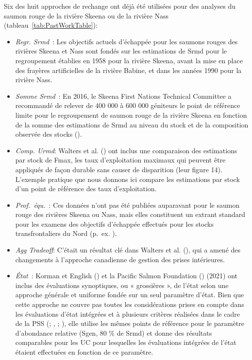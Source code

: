 \documentclass[french,11pt]{book}
\begin{document}
Six des huit approches de rechange ont déjà été utilisées pour des analyses du saumon rouge de la rivière Skeena ou de la rivière Nass (tableau~\ref{tab:PastWorkTable}):
\begin{itemize}

\item
  \emph{Regr. Srmd}~: Les objectifs actuels d'échappée pour les saumons rouges des rivières Skeena et Nass sont fondés sur les estimations de Srmd pour le regroupement établies en 1958 pour la rivière Skeena, avant la mise en place des frayères artificielles de la rivière Babine, et dans les années 1990 pour la rivière Nass.
\item
  \emph{Somme Srmd}~: En 2016, le Skeena First Nations Technical Committee a recommandé de relever de 400 000 à 600 000 géniteurs le point de référence limite pour le regroupement de saumon rouge de la rivière Skeena en fonction de la somme des estimations de Srmd au niveau du stock et de la composition observée des stocks ().
\item
  \emph{Comp. Urmd}: Walters et al. () ont inclus une comparaison des estimations par stock de Fmax, les taux d'exploitation maximaux qui peuvent être appliqués de façon durable sans causer de disparition (leur figure 14). L'exemple pratique que nous donnons ici compare les estimations par stock d'un point de référence des taux d'exploitation.
\item
  \emph{Prof.~équ.}~: Ces données n'ont pas été publiées auparavant pour le saumon rouge des rivières Skeena ou Nass, mais elles constituent un extrant standard pour les examens des objectifs d'échappée effectués pour les stocks transfrontaliers du Nord (p.~ex. ).
\item
  \emph{Agg Tradeoff}: C'était un résultat clé dans Walters et al. (), qui a amené des changements à l'approche canadienne de gestion des prises intérieures.
\item
  \emph{État}~: Korman et English () et la Pacific Salmon Foundation () (2021) ont inclus des évaluations synoptiques, ou « grossières », de l'état selon une approche générale et uniforme fondée sur un seul paramètre d'état. Bien que cette approche ne couvre pas toutes les considérations prises en compte dans les évaluations d'état intégrées et à plusieurs critères réalisées dans le cadre de la PSS (; , ; ), elle utilise les mêmes points de référence pour le paramètre d'abondance relative (Sgen, 80 \% de Srmd) et donne des résultats comparables pour les UC pour lesquelles les évaluations intégrées de l'état étaient effectuées en fonction de ce paramètre.

\end{itemize}
\end{document}
